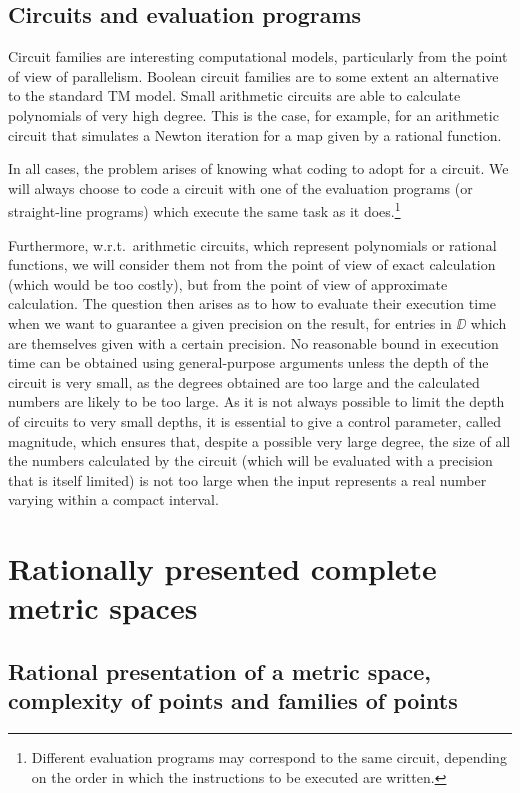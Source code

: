 \subsection{Circuits and evaluation programs}\label{subsec14} 

Circuit families are interesting computational models, particularly from the point of view of parallelism. 
Boolean circuit families are to some extent an alternative to the standard TM model. Small arithmetic circuits are able to calculate polynomials of very high degree. 
This is the case, for example, for an arithmetic circuit that simulates a Newton iteration for a map given by a rational function.
 
In all cases, the problem arises of knowing what coding to adopt for a circuit. We will always choose to code a circuit with one of the evaluation programs (or straight-line programs) which execute the same task as it does.\footnote{Different evaluation programs may correspond to the same circuit, depending on the order in which the instructions to be executed are written.}
 
Furthermore, w.r.t.\ arithmetic circuits, which represent polynomials or rational functions, we will consider them not from the point of view of exact calculation (which would be too costly), but from the point of view of approximate calculation. The question then arises as to how to evaluate their execution time when we want to guarantee a given precision on the result, for entries in $\DD$ which are themselves given with a certain precision. 
No reasonable bound in execution time can be obtained using general-purpose arguments unless the depth of the circuit is very small, as the degrees obtained are too large and the calculated numbers are likely to be too large. As it is not always possible to limit the depth of circuits to very small depths, it is essential to give a control parameter, called magnitude, which ensures that, despite a possible very large degree, the size of all the numbers calculated by the circuit (which will be evaluated with a precision that is itself limited) is not too large when the input represents a real number varying within a compact interval. 



\section{Rationally presented complete metric spaces}\label{sec2}

\subsection[Rational presentation of a metric space, complexity of points \ldots]{Rational presentation of a metric space, complexity of points and families of points}\label{subsec21}

